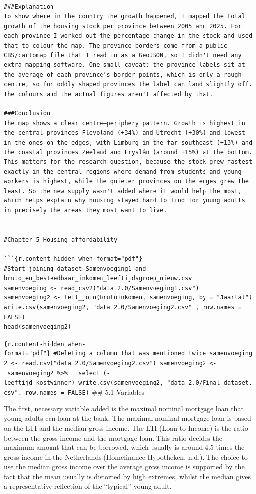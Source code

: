 \documentclass[
]{article}
\begin{document}
{\begin{verbatim}

###Explanation
To show where in the country the growth happened, I mapped the total growth of the housing stock per province between 2005 and 2025. For each province I worked out the percentage change in the stock and used that to colour the map. The province borders come from a public CBS/cartomap file that I read in as a GeoJSON, so I didn't need any extra mapping software. One small caveat: the province labels sit at the average of each province's border points, which is only a rough centre, so for oddly shaped provinces the label can land slightly off. The colours and the actual figures aren't affected by that.

###Conclusion
The map shows a clear centre–periphery pattern. Growth is highest in the central provinces Flevoland (+34%) and Utrecht (+30%) and lowest in the ones on the edges, with Limburg in the far southeast (+13%) and the coastal provinces Zeeland and Fryslân (around +15%) at the bottom. This matters for the research question, because the stock grew fastest exactly in the central regions where demand from students and young workers is highest, while the quieter provinces on the edges grew the least. So the new supply wasn't added where it would help the most, which helps explain why housing stayed hard to find for young adults in precisely the areas they most want to live.


#Chapter 5 Housing affordability

```{r.content-hidden when-format="pdf"}
#Start joining dataset Samenvoeging1 and bruto_en_besteedbaar_inkomen_leeftijdsgroep_nieuw.csv
samenvoeging <- read_csv2("data 2.0/Samenvoeging1.csv")
samenvoeging2 <- left_join(brutoinkomen, samenvoeging, by = "Jaartal")
write.csv(samenvoeging2, "data 2.0/Samenvoeging2.csv" , row.names = FALSE)
head(samenvoeging2)
\end{verbatim}

\texttt{\{r.content-hidden\ when-format="pdf"\}\ \#Deleting\ a\ column\ that\ was\ mentioned\ twice\ samenvoeging2\ \textless{}-\ read.csv("data\ 2.0/Samenvoeging2.csv")\ samenvoeging2\ \textless{}-\ samenvoeging2\ \%\textgreater{}\%\ \ \ select\ (-leeftijd\_kostwinner)\ write.csv(samenvoeging2,\ "data\ 2.0/Final\_dataset.csv",\ row.names\ =\ FALSE)}
\#\# 5.1 Variables

The first, necessary variable added is the maximal nominal mortgage loan
that young adults can loan at the bank. The maximal nominal mortgage
loan is based on the LTI and the median gross income. The LTI
(Loan-to-Income) is the ratio between the gross income and the mortgage
loan. This ratio decides the maximum amount that can be borrowed, which
usually is around 4.5 times the gross income in the Netherlands
(Homefinance Hypotheken, n.d.). The choice to use the median gross
income over the average gross income is supported by the fact that the
mean usually is distorted by high extremes, whilst the median gives a
representative reflection of the ``typical'' young adult.

}
\end{document}
